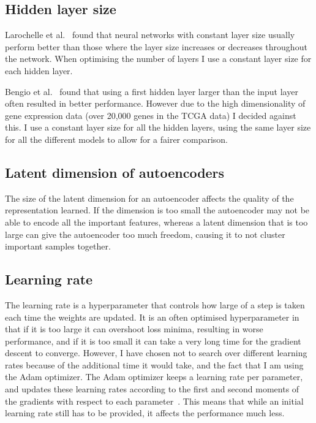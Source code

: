 \documentclass[12pt,a4paper,twoside,openright]{report}
\begin{document}
\subsection{Hidden layer size}
Larochelle et al.~\cite{DBLP:journals/jmlr/LarochelleBLL09} found that neural networks with constant layer size usually perform better than
those where the layer size increases or decreases throughout the network. When optimising the number of layers I use a constant layer size
for each hidden layer.

Bengio et al.~\cite{DBLP:series/lncs/Bengio12} found that using a first hidden layer larger than the input layer often resulted in 
better performance. However due to the high dimensionality of gene expression data (over 20,000 genes in the TCGA data) I decided against 
this. I use a constant layer size for all the hidden layers, using the same layer size for all the different models to allow for a fairer
comparison.

\subsection{Latent dimension of autoencoders}
The size of the latent dimension for an autoencoder affects the quality of the representation learned. If the dimension is too small the 
autoencoder may not be able to encode all the important features, whereas a latent dimension that is too large can give the autoencoder 
too much freedom, causing it to not cluster important samples together.

\subsection{Learning rate}
The learning rate is a hyperparameter that controls how large of a step is taken each time the weights are updated. It is an often
optimised hyperparameter in that if it is too large it can overshoot loss minima, resulting in worse performance, and if it is too 
small it can take a very long time for the gradient descent to converge. However, I have chosen not to search over different learning 
rates because of the additional time it would take, and the fact that I am using the Adam optimizer. The Adam optimizer keeps a 
learning rate per parameter, and updates these learning rates according to the first and second moments of the gradients with respect to each 
parameter~\cite{DBLP:journals/corr/KingmaB14}. This means that while an initial learning rate still has to be provided, it affects the 
performance much less.
\end{document}
